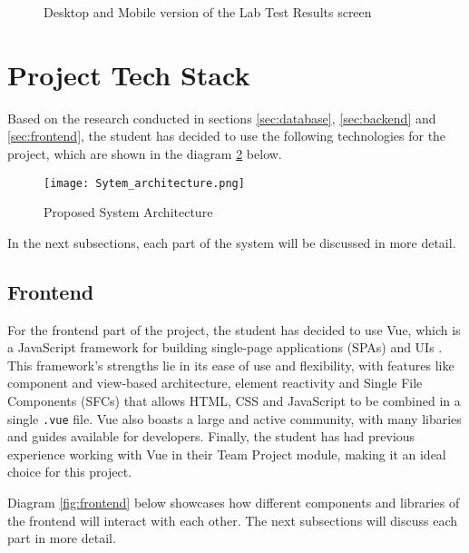 \begin{figure}[ht]
    \centering
    \hspace{0.05\textwidth} 
    \caption{Desktop and Mobile version of the Lab Test Results screen}
    \label{fig:lab}
\end{figure}

\section{Project Tech Stack}

Based on the research conducted in sections \ref{sec:database}, \ref{sec:backend} and \ref{sec:frontend}, the student has decided to use the following technologies for the project, which are shown in the diagram \ref{fig:architecture} below.

\begin{figure}[htbp]
    \centering
    \texttt{[image: Sytem\_architecture.png]}
    \caption{Proposed System Architecture}
    \label{fig:architecture}
\end{figure}

In the next subsections, each part of the system will be discussed in more detail.

\subsection{Frontend}

For the frontend part of the project, the student has decided to use Vue, which is a JavaScript framework for building single-page applications (SPAs) and UIs \parencite{vue}. This framework's strengths lie in its ease of use and flexibility, with features like component and view-based architecture, element reactivity and Single File Components (SFCs) that allows HTML, CSS and JavaScript to be combined in a single \lstinline{.vue} file. Vue also boasts a large and active community, with many libaries and guides available for developers. Finally, the student has had previous experience working with Vue in their Team Project module, making it an ideal choice for this project.

Diagram \ref{fig:frontend} below showcases how different components and libraries of the frontend will interact with each other. The next subsections will discuss each part in more detail.


